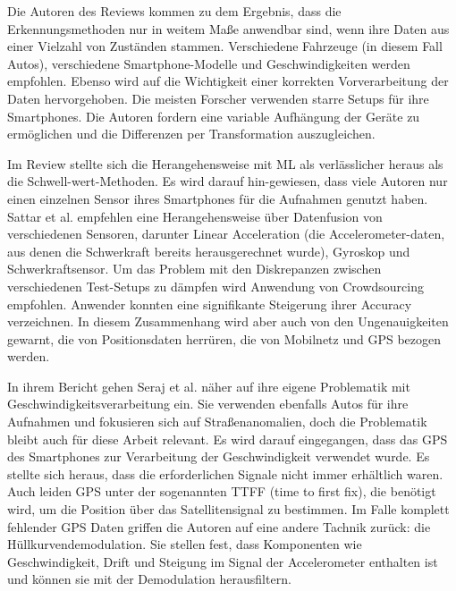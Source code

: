 Die Autoren des Reviews kommen zu dem Ergebnis, dass die Erkennungsmethoden nur in weitem Maße anwendbar sind, wenn ihre Daten aus einer Vielzahl von Zuständen stammen. Verschiedene Fahrzeuge (in diesem Fall Autos), verschiedene Smartphone-Modelle und Geschwindigkeiten werden empfohlen. Ebenso wird auf die Wichtigkeit einer korrekten Vorverarbeitung der Daten hervorgehoben. Die meisten Forscher verwenden starre Setups für ihre Smartphones. Die Autoren fordern eine variable Aufhängung der Geräte zu ermöglichen und die Differenzen per Transformation auszugleichen. \cite{Sattar2018}

Im Review stellte sich die Herangehensweise mit ML als verlässlicher heraus als die Schwell-wert-Methoden. Es wird darauf hin-gewiesen, dass viele Autoren nur einen einzelnen Sensor ihres Smartphones für die Aufnahmen genutzt haben. Sattar et al. empfehlen eine Herangehensweise über Datenfusion von verschiedenen Sensoren, darunter Linear Acceleration (die Accelerometer-daten, aus denen die Schwerkraft bereits herausgerechnet wurde), Gyroskop und Schwerkraftsensor. Um das Problem mit den Diskrepanzen zwischen verschiedenen Test-Setups zu dämpfen wird Anwendung von Crowdsourcing empfohlen. Anwender konnten eine signifikante Steigerung ihrer Accuracy verzeichnen. In diesem Zusammenhang wird aber auch von den Ungenauigkeiten gewarnt, die von Positionsdaten herrüren, die von Mobilnetz und GPS bezogen werden. \cite{Sattar2018}

In ihrem Bericht gehen Seraj et al. näher auf ihre eigene Problematik mit Geschwindigkeitsverarbeitung ein. Sie verwenden ebenfalls Autos für ihre Aufnahmen und fokusieren sich auf Straßenanomalien, doch die Problematik bleibt auch für diese Arbeit relevant. Es wird darauf eingegangen, dass das GPS des Smartphones zur Verarbeitung der Geschwindigkeit verwendet wurde. Es stellte sich heraus, dass die erforderlichen Signale nicht immer erhältlich waren. Auch leiden GPS unter der sogenannten TTFF (time to first fix), die benötigt wird, um die Position über das Satellitensignal zu bestimmen. Im Falle komplett fehlender GPS Daten griffen die Autoren auf eine andere Tachnik zurück: die Hüllkurvendemodulation. Sie stellen fest, dass Komponenten wie Geschwindigkeit, Drift und Steigung im Signal der Accelerometer enthalten ist und können sie mit der Demodulation herausfiltern. \cite{Seraj2016}

